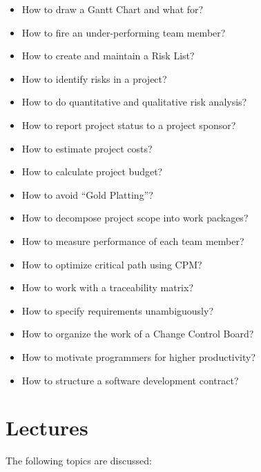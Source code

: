 \documentclass[nobrand,anonymous,nodate,nosecurity]{huawei}
\begin{document}
{\begin{itemize}
\item How to draw a Gantt Chart and what for?
\item How to fire an under-performing team member?
\item How to create and maintain a Risk List?
\item How to identify risks in a project?
\item How to do quantitative and qualitative risk analysis?
\item How to report project status to a project sponsor?
\item How to estimate project costs?
\item How to calculate project budget?
\item How to avoid ``Gold Platting''?
\item How to decompose project scope into work packages?
\item How to measure performance of each team member?
\item How to optimize critical path using CPM?
\item How to work with a traceability matrix?
\item How to specify requirements unambiguously?
\item How to organize the work of a Change Control Board?
\item How to motivate programmers for higher productivity?
\item How to structure a software development contract?
\end{itemize}

\newpage
\section*{Lectures}

The following topics are discussed:

}
\end{document}
